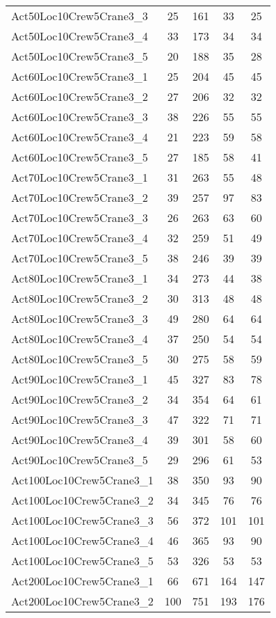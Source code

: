 \begin{center}
\begin{longtable}{ | l | c | c | c | c | }
Act50Loc10Crew5Crane3\_3	&	25	&	161	&	33	&	25	\\
Act50Loc10Crew5Crane3\_4	&	33	&	173	&	34	&	34	\\
Act50Loc10Crew5Crane3\_5	&	20	&	188	&	35	&	28	\\
Act60Loc10Crew5Crane3\_1	&	25	&	204	&	45	&	45	\\
Act60Loc10Crew5Crane3\_2	&	27	&	206	&	32	&	32	\\
Act60Loc10Crew5Crane3\_3	&	38	&	226	&	55	&	55	\\
Act60Loc10Crew5Crane3\_4	&	21	&	223	&	59	&	58	\\
Act60Loc10Crew5Crane3\_5	&	27	&	185	&	58	&	41	\\
Act70Loc10Crew5Crane3\_1	&	31	&	263	&	55	&	48	\\
Act70Loc10Crew5Crane3\_2	&	39	&	257	&	97	&	83	\\
Act70Loc10Crew5Crane3\_3	&	26	&	263	&	63	&	60	\\
Act70Loc10Crew5Crane3\_4	&	32	&	259	&	51	&	49	\\
Act70Loc10Crew5Crane3\_5	&	38	&	246	&	39	&	39	\\
Act80Loc10Crew5Crane3\_1	&	34	&	273	&	44	&	38	\\
Act80Loc10Crew5Crane3\_2	&	30	&	313	&	48	&	48	\\
Act80Loc10Crew5Crane3\_3	&	49	&	280	&	64	&	64	\\
Act80Loc10Crew5Crane3\_4	&	37	&	250	&	54	&	54	\\
Act80Loc10Crew5Crane3\_5	&	30	&	275	&	58	&	59	\\
Act90Loc10Crew5Crane3\_1	&	45	&	327	&	83	&	78	\\
Act90Loc10Crew5Crane3\_2	&	34	&	354	&	64	&	61	\\
Act90Loc10Crew5Crane3\_3	&	47	&	322	&	71	&	71	\\
Act90Loc10Crew5Crane3\_4	&	39	&	301	&	58	&	60	\\
Act90Loc10Crew5Crane3\_5	&	29	&	296	&	61	&	53	\\
Act100Loc10Crew5Crane3\_1	&	38	&	350	&	93	&	90	\\
Act100Loc10Crew5Crane3\_2	&	34	&	345	&	76	&	76	\\
Act100Loc10Crew5Crane3\_3	&	56	&	372	&	101	&	101	\\
Act100Loc10Crew5Crane3\_4	&	46	&	365	&	93	&	90	\\
Act100Loc10Crew5Crane3\_5	&	53	&	326	&	53	&	53	\\
Act200Loc10Crew5Crane3\_1	&	66	&	671	&	164	&	147	\\
Act200Loc10Crew5Crane3\_2	&	100	&	751	&	193	&	176	\\

\end{longtable}
\end{center}
